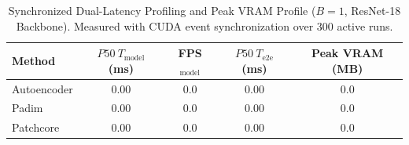 \begin{table}[t]
\centering
\small
\caption{Synchronized Dual-Latency Profiling and Peak VRAM Profile ($B=1$, ResNet-18 Backbone). Measured with CUDA event synchronization over 300 active runs.}
\label{tab:deployment_profiling}
\begin{tabular}{lcccc}
\toprule
\textbf{Method} & \textbf{$P50\ T_{\text{model}}$ (ms)} & \textbf{FPS$_{\text{model}}$} & \textbf{$P50\ T_{\text{e2e}}$ (ms)} & \textbf{Peak VRAM (MB)} \\
\midrule
Autoencoder & 0.00 & 0.0 & 0.00 & 0.0 \\
Padim & 0.00 & 0.0 & 0.00 & 0.0 \\
Patchcore & 0.00 & 0.0 & 0.00 & 0.0 \\
\bottomrule
\end{tabular}
\end{table}
